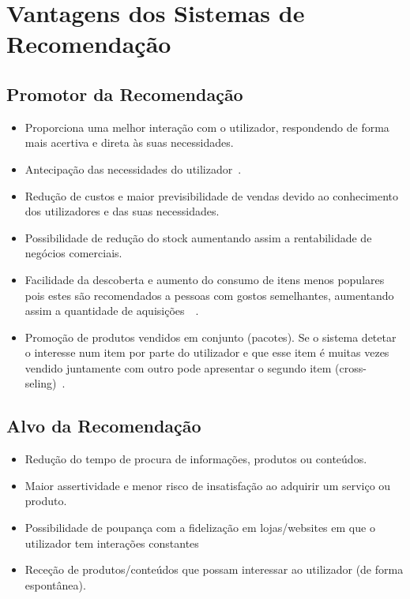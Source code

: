 \section{Vantagens dos Sistemas de Recomendação}

\subsection{Promotor da Recomendação}
\begin{itemize}
\item Proporciona uma melhor interação com o utilizador, respondendo de forma mais acertiva e direta às suas necessidades.
\item Antecipação das necessidades do utilizador~\cite{ref_book2}.
\item Redução de custos e maior previsibilidade de vendas devido ao conhecimento dos utilizadores e das suas necessidades.
\item Possibilidade de redução do stock aumentando assim a rentabilidade de negócios comerciais.
\item Facilidade da descoberta e aumento do consumo de itens menos populares pois estes são recomendados a pessoas com gostos semelhantes, aumentando assim a quantidade de aquisições~\cite{ref_book2}~\cite{ref_article1}.
\item Promoção de produtos vendidos em conjunto (pacotes). Se o sistema detetar o interesse num item por parte do utilizador e que esse item é muitas vezes vendido juntamente com outro pode apresentar o segundo item (cross-seling)~\cite{ref_book2}.
\end{itemize}


\subsection{Alvo da Recomendação}
\begin{itemize}
\item Redução do tempo de procura de informações, produtos ou conteúdos.
\item Maior assertividade e menor risco de insatisfação ao adquirir um serviço ou produto.
\item Possibilidade de poupança com a fidelização em lojas/websites em que o utilizador tem interações constantes
\item Receção de produtos/conteúdos que possam interessar ao utilizador (de forma espontânea).
\end{itemize}


